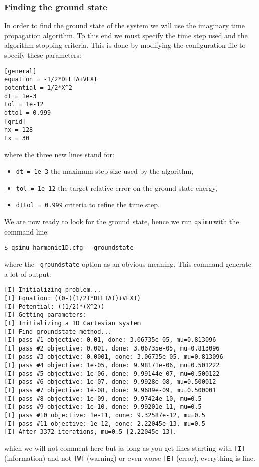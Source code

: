 \documentclass[12pt,a4paper]{report}
\newcommand{\qsimu}{\texttt{qsimu}\,}
\begin{document}
\subsubsection{Finding the ground state}
In order to find the ground state of the system we will use the imaginary time propagation algorithm.
To this end we must specify the time step used and the algorithm stopping criteria.
This is done by modifying the configuration file to specify these parameters:
\begin{verbatim}
[general]
equation = -1/2*DELTA+VEXT
potential = 1/2*X^2
dt = 1e-3
tol = 1e-12
dttol = 0.999
[grid]
nx = 128
Lx = 30
\end{verbatim}
where the three new lines stand for:
\begin{itemize}
\item\texttt{dt = 1e-3} the maximum step size used by the algorithm,
\item\texttt{tol = 1e-12} the target relative error on the ground state energy,
\item\texttt{dttol = 0.999} criteria to refine the time step.
\end{itemize}

We are now ready to look for the ground state, hence we run \qsimu with the command line:
\begin{verbatim}
$ qsimu harmonic1D.cfg --groundstate
\end{verbatim}
where the \texttt{--groundstate} option as an obvious meaning.
This command generate a lot of output:
\begin{verbatim}
[I] Initializing problem...
[I] Equation: ((0-((1/2)*DELTA))+VEXT)
[I] Potential: ((1/2)*(X^2))
[I] Getting parameters:
[I] Initializing a 1D Cartesian system
[I] Find groundstate method...
[I]	pass #1 objective: 0.01, done: 3.06735e-05, mu=0.813096
[I]	pass #2 objective: 0.001, done: 3.06735e-05, mu=0.813096
[I]	pass #3 objective: 0.0001, done: 3.06735e-05, mu=0.813096
[I]	pass #4 objective: 1e-05, done: 9.98171e-06, mu=0.501222
[I]	pass #5 objective: 1e-06, done: 9.99144e-07, mu=0.500122
[I]	pass #6 objective: 1e-07, done: 9.9928e-08, mu=0.500012
[I]	pass #7 objective: 1e-08, done: 9.9689e-09, mu=0.500001
[I]	pass #8 objective: 1e-09, done: 9.97424e-10, mu=0.5
[I]	pass #9 objective: 1e-10, done: 9.99201e-11, mu=0.5
[I]	pass #10 objective: 1e-11, done: 9.32587e-12, mu=0.5
[I]	pass #11 objective: 1e-12, done: 2.22045e-13, mu=0.5
[I] After 3372 iterations, mu=0.5 [2.22045e-13].
\end{verbatim}
which we will not comment here but as long as you get lines starting with \texttt{[I]} (information) and not \texttt{[W]} (warning) or even worse \texttt{[E]} (error), everything is fine.
\end{document}
